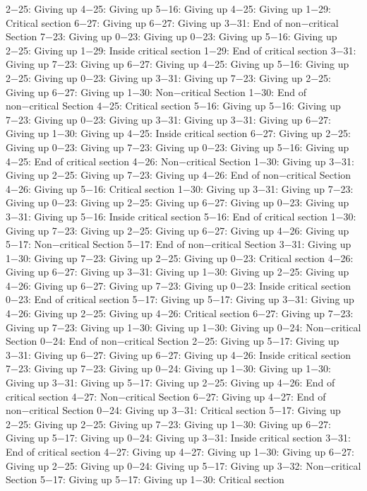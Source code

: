 2−25: Giving up
4−25: Giving up
5−16: Giving up
4−25: Giving up
1−29: Critical section
6−27: Giving up
6−27: Giving up
3−31: End of non−critical Section
7−23: Giving up
0−23: Giving up
0−23: Giving up
5−16: Giving up
2−25: Giving up
1−29: Inside critical section
1−29: End of critical section
3−31: Giving up
7−23: Giving up
6−27: Giving up
4−25: Giving up
5−16: Giving up
2−25: Giving up
0−23: Giving up
3−31: Giving up
7−23: Giving up
2−25: Giving up
6−27: Giving up
1−30: Non−critical Section
1−30: End of non−critical Section
4−25: Critical section
5−16: Giving up
5−16: Giving up
7−23: Giving up
0−23: Giving up
3−31: Giving up
3−31: Giving up
6−27: Giving up
1−30: Giving up
4−25: Inside critical section
6−27: Giving up
2−25: Giving up
0−23: Giving up
7−23: Giving up
0−23: Giving up
5−16: Giving up
4−25: End of critical section
4−26: Non−critical Section
1−30: Giving up
3−31: Giving up
2−25: Giving up
7−23: Giving up
4−26: End of non−critical Section
4−26: Giving up
5−16: Critical section
1−30: Giving up
3−31: Giving up
7−23: Giving up
0−23: Giving up
2−25: Giving up
6−27: Giving up
0−23: Giving up
3−31: Giving up
5−16: Inside critical section
5−16: End of critical section
1−30: Giving up
7−23: Giving up
2−25: Giving up
6−27: Giving up
4−26: Giving up
5−17: Non−critical Section
5−17: End of non−critical Section
3−31: Giving up
1−30: Giving up
7−23: Giving up
2−25: Giving up
0−23: Critical section
4−26: Giving up
6−27: Giving up
3−31: Giving up
1−30: Giving up
2−25: Giving up
4−26: Giving up
6−27: Giving up
7−23: Giving up
0−23: Inside critical section
0−23: End of critical section
5−17: Giving up
5−17: Giving up
3−31: Giving up
4−26: Giving up
2−25: Giving up
4−26: Critical section
6−27: Giving up
7−23: Giving up
7−23: Giving up
1−30: Giving up
1−30: Giving up
0−24: Non−critical Section
0−24: End of non−critical Section
2−25: Giving up
5−17: Giving up
3−31: Giving up
6−27: Giving up
6−27: Giving up
4−26: Inside critical section
7−23: Giving up
7−23: Giving up
0−24: Giving up
1−30: Giving up
1−30: Giving up
3−31: Giving up
5−17: Giving up
2−25: Giving up
4−26: End of critical section
4−27: Non−critical Section
6−27: Giving up
4−27: End of non−critical Section
0−24: Giving up
3−31: Critical section
5−17: Giving up
2−25: Giving up
2−25: Giving up
7−23: Giving up
1−30: Giving up
6−27: Giving up
5−17: Giving up
0−24: Giving up
3−31: Inside critical section
3−31: End of critical section
4−27: Giving up
4−27: Giving up
1−30: Giving up
6−27: Giving up
2−25: Giving up
0−24: Giving up
5−17: Giving up
3−32: Non−critical Section
5−17: Giving up
5−17: Giving up
1−30: Critical section
